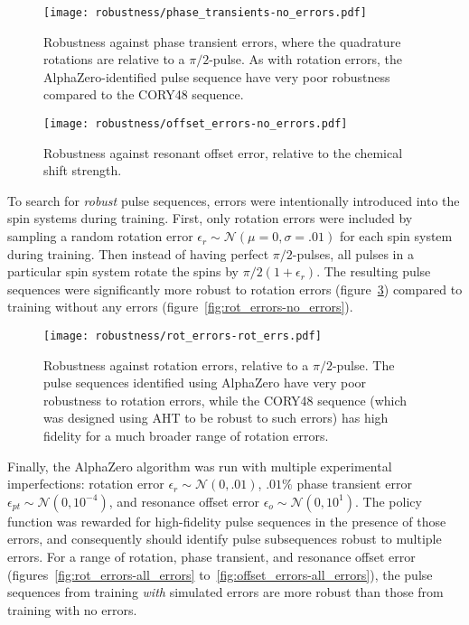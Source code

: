 \begin{figure}[H]
    \centering
    \texttt{[image: robustness/phase\_transients-no\_errors.pdf]}
    \caption{Robustness against phase transient errors, where the quadrature rotations are relative to a $\pi/2$-pulse. As with rotation errors, the AlphaZero-identified pulse sequence have very poor robustness compared to the CORY48 sequence.
    }
    \label{fig:phase_transients-no_errors}
\end{figure}


\begin{figure}[H]
    \centering
    \texttt{[image: robustness/offset\_errors-no\_errors.pdf]}
    \caption{Robustness against resonant offset error, relative to the chemical shift strength.
    }
    \label{fig:offset_errors-no_errors}
\end{figure}



To search for \emph{robust} pulse sequences, errors were intentionally introduced into the spin systems during training. First, only rotation errors were included by sampling a random rotation error $\epsilon_r \sim \mathcal{N}(\mu=0, \sigma=.01)$ for each spin system during training. Then instead of having perfect $\pi/2$-pulses, all pulses in a particular spin system rotate the spins by $\pi/2(1+\epsilon_r)$. The resulting pulse sequences were significantly more robust to rotation errors (figure~\ref{fig:rot_errors-rot_errors})
compared to training without any errors (figure~\ref{fig:rot_errors-no_errors}).

\begin{figure}[H]
    \centering
    \texttt{[image: robustness/rot\_errors-rot\_errs.pdf]}
    \caption{Robustness against rotation errors, relative to a $\pi/2$-pulse. The pulse sequences identified using AlphaZero have very poor robustness to rotation errors, while the CORY48 sequence (which was designed using AHT to be robust to such errors) has high fidelity for a much broader range of rotation errors.
    }
    \label{fig:rot_errors-rot_errors}
\end{figure}


Finally, the AlphaZero algorithm was run with multiple experimental imperfections: rotation error $\epsilon_r \sim \mathcal{N}(0, .01)$, $.01\%$ phase transient error $\epsilon_{pt} \sim \mathcal{N}(0, 10^{-4})$, and resonance offset error $\epsilon_o \sim \mathcal{N}(0, 10^1)$.
The policy function was rewarded for high-fidelity pulse sequences in the presence of those errors, and consequently should identify pulse subsequences robust to multiple errors. For a range of rotation, phase transient, and resonance offset error (figures~\ref{fig:rot_errors-all_errors} to~\ref{fig:offset_errors-all_errors}), the pulse sequences from training \emph{with} simulated errors are more robust than those from training with no errors.

